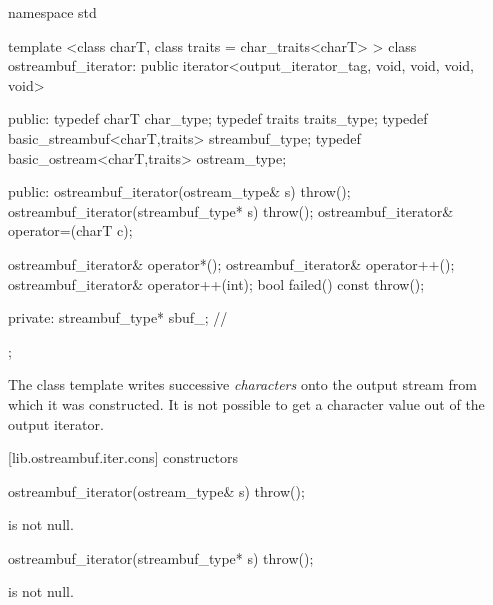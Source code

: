 %
\begin{codeblock}
namespace std {
  template <class charT, class traits = char_traits<charT> >
  class ostreambuf_iterator:
    public iterator<output_iterator_tag, void, void, void, void> {
  public:
    typedef charT                         char_type;
    typedef traits                        traits_type;
    typedef basic_streambuf<charT,traits> streambuf_type;
    typedef basic_ostream<charT,traits>   ostream_type;

  public:
    ostreambuf_iterator(ostream_type& s) throw();
    ostreambuf_iterator(streambuf_type* s) throw();
    ostreambuf_iterator& operator=(charT c);

    ostreambuf_iterator& operator*();
    ostreambuf_iterator& operator++();
    ostreambuf_iterator& operator++(int);
    bool failed() const throw();

  private:
    streambuf_type* sbuf_;    // \expos

  };
}
\end{codeblock}

\pnum
The
class template
writes successive
\textit{characters}
onto the output stream from which it was constructed.
It is not possible to get a character value out of the output iterator.

[lib.ostreambuf.iter.cons]{ constructors}


%
\begin{itemdecl}
ostreambuf_iterator(ostream_type& s) throw();
\end{itemdecl}

\begin{itemdescr}
\pnum
\requires
{}
is not null.
\end{itemdescr}

\begin{itemdescr}
\pnum
\effects
{}
\end{itemdescr}


%
\begin{itemdecl}
ostreambuf_iterator(streambuf_type* s) throw();
\end{itemdecl}

\begin{itemdescr}
\pnum
\requires
{}
is not null.

\pnum
\effects
{}
\end{itemdescr}

